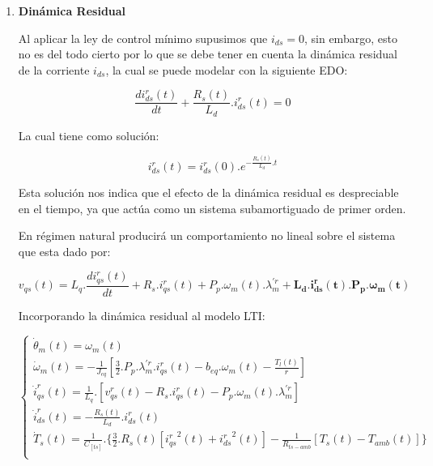 \documentclass{article}
\begin{document}
\begin{enumerate}[label=\roman*.]
    \item \textbf{Dinámica Residual}
    
    Al aplicar la ley de control mínimo supusimos que $i_{ds} = 0$, sin embargo, esto no es del todo cierto
    por lo que se debe tener en cuenta la dinámica residual de la corriente $i_{ds}$, la cual se puede
    modelar con la siguiente EDO:

    \begin{equation}
        \frac{di_{ds}^r(t)}{dt} + \frac{R_{s}(t)}{L_{d}}.i_{ds}^r(t) = 0 
    \end{equation} 

    La cual tiene como solución:

    \begin{equation}
        i_{ds}^r(t) = i_{ds}^r(0).e^{-\frac{R_{s}(t)}{L_{d}}.t}
    \end{equation}

    Esta solución nos indica que el efecto de la dinámica residual es despreciable en el tiempo, ya que actúa como
    un sistema subamortiguado de primer orden.

    En régimen natural producirá un comportamiento no lineal sobre el sistema que esta dado por:

    \begin{equation}\label{eq.dinamica_residual}
        v_{qs}(t) = L_{q}.\frac{di_{qs}^r(t)}{dt} + R_{s}.i_{qs}^r(t) + P_{p}.\omega_{m}(t).\lambda_{m}^{\prime r} + \mathbf{L_{d}.i_{ds}^r(t).P_{p}.\omega_{m}(t)}
    \end{equation}

    Incorporando la dinámica residual al modelo LTI:    

    \begin{equation}
        \begin{cases}
            \dot{\theta}_{m}(t) = \omega_{m}(t)\\
            \dot{\omega}_{m}(t) = -\frac{1}{J_{eq}}[\frac{3}{2}.P_{p}.\lambda_{m}^{\prime r} .i_{qs}^r(t) - b_{eq}.\omega_{m}(t)-\frac{T_{l}(t)}{r}]\\
            \dot{i}_{qs}^r(t) = \frac{1}{L_{q}}.[v_{qs}^r(t) - R_{s}.i_{qs}^r(t) - P_{p}.\omega_{m}(t).\lambda_{m}^{\prime r}]\\
            \dot{i}_{ds}^r(t) = -\frac{R_{s}(t)}{L_{d}}.i_{ds}^r(t) \\
            \dot{T}_{s}(t) = \frac{1}{C_[ts]}.\{\frac{3}{2}.R_{s}(t)[{i_{qs}^r}^2(t) + {i_{ds}^r}^2(t)] - \frac{1}{R_{ts-amb}}[T_{s}(t) - T_{amb}(t)]\}\\
        \end{cases}    
    \end{equation}


\end{enumerate}
\end{document}
